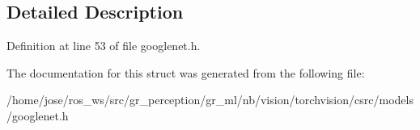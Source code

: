 \subsection{Detailed Description}


Definition at line 53 of file googlenet.\+h.



The documentation for this struct was generated from the following file\+:\begin{DoxyCompactItemize}
\item 
/home/jose/ros\+\_\+ws/src/gr\+\_\+perception/gr\+\_\+ml/nb/vision/torchvision/csrc/models/googlenet.\+h\end{DoxyCompactItemize}
